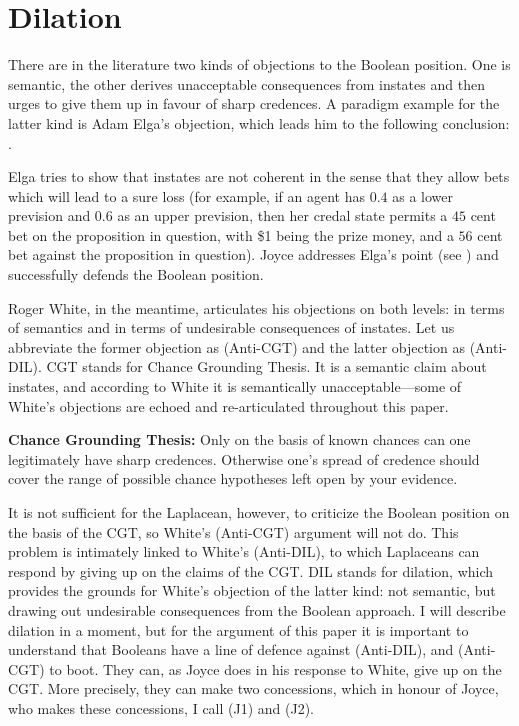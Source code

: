 \documentclass[11pt]{article}
\begin{document}
\section{Dilation}
\label{Dilation}

There are in the literature two kinds of objections to the
Boolean position. One is semantic, the other derives unacceptable
consequences from instates and then urges to give them up in favour of
sharp credences. A paradigm example for the latter kind is Adam Elga's
objection, which leads him to the following conclusion:
 .

Elga tries to show that instates are not coherent in the sense that
they allow bets which will lead to a sure loss (for example, if an
agent has $0.4$ as a lower prevision and $0.6$ as an upper prevision,
then her credal state permits a $45$ cent bet on the proposition in
question, with \$1 being the prize money, and a $56$ cent bet against
the proposition in question). Joyce addresses Elga's point (see
) and successfully defends the Boolean
position.

Roger White, in the meantime, articulates his objections on both
levels: in terms of semantics and in terms of undesirable consequences
of instates. Let us abbreviate the former objection as (Anti-CGT) and
the latter objection as (Anti-DIL). CGT stands for Chance Grounding
Thesis. It is a semantic claim about instates, and according to White
it is semantically unacceptable---some of White's objections are
echoed and re-articulated throughout this paper.

\begin{quotex}
  \textbf{Chance Grounding Thesis:} Only on the basis of known chances
  can one legitimately have sharp credences. Otherwise one's spread of
  credence should cover the range of possible chance hypotheses left
  open by your evidence. 
\end{quotex}

It is not sufficient for the Laplacean, however, to criticize the
Boolean position on the basis of the CGT, so White's (Anti-CGT)
argument will not do. This problem is intimately linked to White's
(Anti-DIL), to which Laplaceans can respond by giving up on the claims
of the CGT. DIL stands for dilation, which provides the grounds for
White's objection of the latter kind: not semantic, but drawing out
undesirable consequences from the Boolean approach. I will describe
dilation in a moment, but for the argument of this paper it is
important to understand that Booleans have a line of defence against
(Anti-DIL), and (Anti-CGT) to boot. They can, as Joyce does in his
response to White, give up on the CGT. More precisely, they can make
two concessions, which in honour of Joyce, who makes these
concessions, I call (J1) and (J2). 
\end{document}

